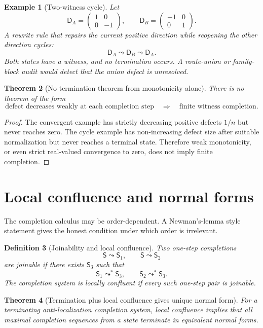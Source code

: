 \documentclass[11pt]{article}
\newtheorem{theorem}{Theorem}[section]
\newtheorem{definition}[theorem]{Definition}
\newtheorem{example}[theorem]{Example}
\newcommand{\D}{\mathsf D}
\newcommand{\Sstate}{\mathsf S}
\begin{document}
\begin{example}[Two-witness cycle]
Let
\[
\D_A=\begin{pmatrix}1&0\\0&-1\end{pmatrix},
\qquad
\D_B=\begin{pmatrix}-1&0\\0&1\end{pmatrix}.
\]
A rewrite rule that repairs the current positive direction while reopening the other direction cycles:
\[
\D_A\leadsto \D_B\leadsto \D_A.
\]
Both states have a witness, and no termination occurs.  A route-union or family-block audit would detect that the union defect is unresolved.
\end{example}

\begin{theorem}[No termination theorem from monotonicity alone]
There is no theorem of the form
\[
\text{defect decreases weakly at each completion step}
\quad\Longrightarrow\quad
\text{finite witness completion}.
\]
\end{theorem}

\begin{proof}
The convergent example has strictly decreasing positive defects $1/n$ but never reaches zero.  The cycle example has non-increasing defect size after suitable normalization but never reaches a terminal state.  Therefore weak monotonicity, or even strict real-valued convergence to zero, does not imply finite completion.
\end{proof}

\section{Local confluence and normal forms}

The completion calculus may be order-dependent.  A Newman's-lemma style statement gives the honest condition under which order is irrelevant.

\begin{definition}[Joinability and local confluence]
Two one-step completions
\[
\Sstate\leadsto \Sstate_1,
\qquad
\Sstate\leadsto \Sstate_2
\]
are joinable if there exists $\Sstate_3$ such that
\[
\Sstate_1\leadsto^*\Sstate_3,
\qquad
\Sstate_2\leadsto^*\Sstate_3.
\]
The completion system is locally confluent if every such one-step pair is joinable.
\end{definition}

\begin{theorem}[Termination plus local confluence gives unique normal form]
For a terminating anti-localization completion system, local confluence implies that all maximal completion sequences from a state terminate in equivalent normal forms.
\end{theorem}
\end{document}
